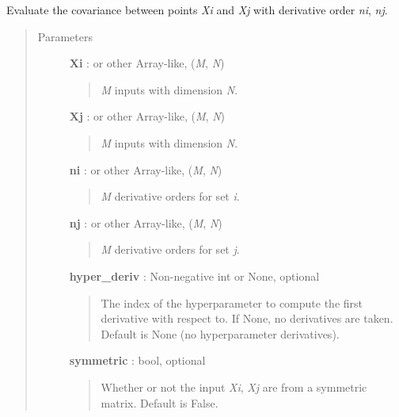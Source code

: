 \documentclass[letterpaper,10pt,english]{sphinxmanual}
\begin{document}
\begin{fulllineitems}

\begin{fulllineitems}
\label{gptools.kernel:gptools.kernel.core.Kernel.__call__}
Evaluate the covariance between points \emph{Xi} and \emph{Xj} with derivative order \emph{ni}, \emph{nj}.
\begin{quote}\begin{description}
\item[{Parameters }] \leavevmode
\textbf{Xi} :  or other Array-like, (\emph{M}, \emph{N})
\begin{quote}

\emph{M} inputs with dimension \emph{N}.
\end{quote}

\textbf{Xj} :  or other Array-like, (\emph{M}, \emph{N})
\begin{quote}

\emph{M} inputs with dimension \emph{N}.
\end{quote}

\textbf{ni} :  or other Array-like, (\emph{M}, \emph{N})
\begin{quote}

\emph{M} derivative orders for set \emph{i}.
\end{quote}

\textbf{nj} :  or other Array-like, (\emph{M}, \emph{N})
\begin{quote}

\emph{M} derivative orders for set \emph{j}.
\end{quote}

\textbf{hyper\_deriv} : Non-negative int or None, optional
\begin{quote}

The index of the hyperparameter to compute the first derivative
with respect to. If None, no derivatives are taken. Default is None
(no hyperparameter derivatives).
\end{quote}

\textbf{symmetric} : bool, optional
\begin{quote}

Whether or not the input \emph{Xi}, \emph{Xj} are from a symmetric matrix.
Default is False.
\end{quote}


\end{description}
\end{quote}
\end{fulllineitems}
\end{fulllineitems}
\end{document}
